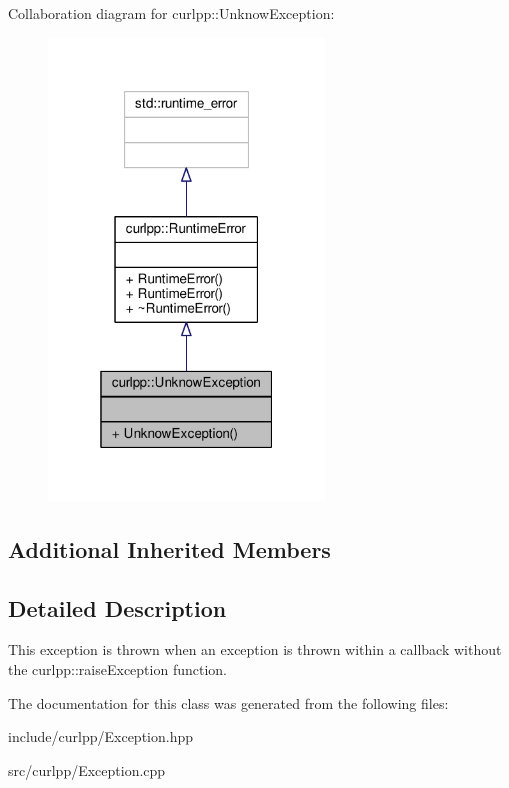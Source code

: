 Collaboration diagram for curlpp\-:\-:Unknow\-Exception\-:
\nopagebreak
\begin{figure}[H]
\begin{center}
\leavevmode
\includegraphics[width=208pt]{classcurlpp_1_1UnknowException__coll__graph}
\end{center}
\end{figure}
\subsection*{Additional Inherited Members}


\subsection{Detailed Description}
This exception is thrown when an exception is thrown within a callback without the curlpp\-::raise\-Exception function. 

The documentation for this class was generated from the following files\-:\begin{DoxyCompactItemize}
\item 
include/curlpp/Exception.\-hpp\item 
src/curlpp/Exception.\-cpp\end{DoxyCompactItemize}
